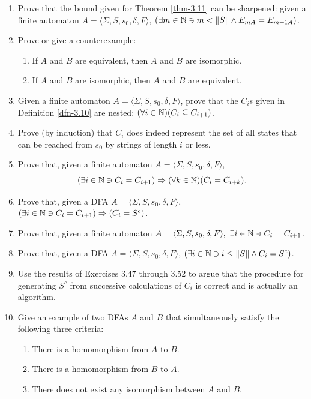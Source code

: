 \begin{enumerate}[{3.}1. ]
\item Prove that the bound given for Theorem \ref{thm-3.11} can be sharpened: given a
finite automaton $A=\langle\Sigma,S,s_0,\delta,F\rangle$,
$(\exists m \in \mathbb{N} \ni m < \|S\| \wedge E_{mA} = E_{m+1A})$.

\item Prove or give a counterexample:
\begin{enumerate}
\item If $A$ and $B$ are equivalent, then $A$ and $B$ are isomorphic.
\item If $A$ and $B$ are isomorphic, then $A$ and $B$ are equivalent.
\end{enumerate}

\item Given a finite automaton $A =\langle\Sigma,S,s_0,\delta,F\rangle$, prove
that the $C_i$s given in Definition \ref{dfn-3.10} are nested:
$(\forall i \in \mathbb{N})(C_i \subseteq C_{i+1})$.

\item Prove (by induction) that $C_i$ does indeed represent the set of all
states that can be reached from $s_0$ by strings of length $i$ or less.

\item Prove that, given a finite automaton
$A =\langle\Sigma,S,s_0,\delta,F\rangle$,
\[ (\exists i \in \mathbb{N} \ni C_i=C_{i+1}) \Rightarrow
	(\forall k \in \mathbb{N})(C_i = C_{i+k}). \]

\item Prove that, given a DFA $A =\langle\Sigma,S,s_0,\delta,F\rangle$,
$(\exists i \in \mathbb{N} \ni C_i = C_{i+1}) \Rightarrow (C_i = S^c)$.

\item Prove that, given a finite automaton
$A =\langle\Sigma,S,s_0,\delta,F\rangle,\ \exists i \in \mathbb{N} \ni C_i = C_{i+1}$.

\item Prove that, given a DFA $A =\langle\Sigma,S,s_0,\delta,F\rangle$,
$(\exists i \in \mathbb{N} \ni i \leq \|S\| \wedge C_i = S^c)$.

\item Use the results of Exercises 3.47 through 3.52 to argue that the procedure
for generating $S^c$ from successive calculations of $C_i$ is correct and is
actually an algorithm.

\item Give an example of two DFAs $A$ and $B$ that simultaneously satisfy the
following three criteria:
\begin{enumerate}[1.]
\item There is a homomorphism from $A$ to $B$.
\item There is a homomorphism from $B$ to $A$.
\item There does not exist any isomorphism between $A$ and $B$.
\end{enumerate}


\end{enumerate}
